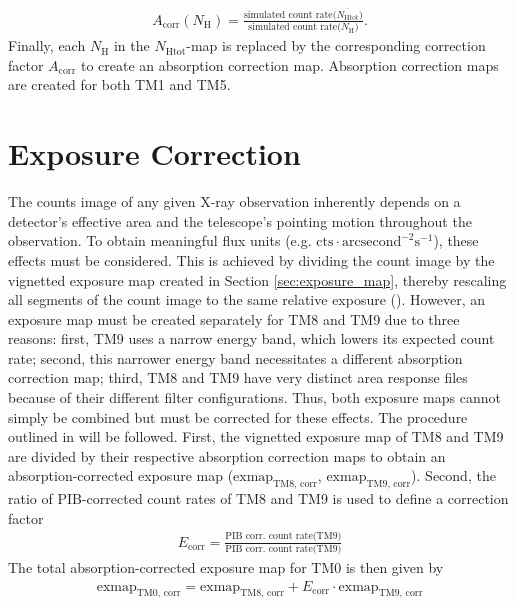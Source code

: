 \begin{align*}
    A_{\text{corr}}(N_\text{H}) = \frac{\text{simulated count rate}\bigl(\overline{N_{\text{Htot}}}\bigr)}{\text{simulated count rate}\bigl(N_\text{H}\bigr)}.
\end{align*}
Finally, each \(\textstyle{N_\text{H}}\) in the \({\textstyle N_\text{Htot}}\)-map is replaced by the corresponding correction factor \(A_\text{corr}\) to create an absorption correction map. Absorption correction maps are created for both TM1 and TM5.
\section{Exposure Correction}\label{sec:exposure}
The counts image of any given X-ray observation inherently depends on a detector's effective area and the telescope's pointing motion throughout the observation. To obtain meaningful flux units (e.g. \(\text{cts}\cdot\text{arcsecond}^{-2}\text{s}^{-1}\)), these effects must be considered. This is achieved by dividing the count image by the vignetted exposure map created in Section \ref{sec:exposure_map}, thereby rescaling all segments of the count image to the same relative exposure (\cite{davis2001formal}). However, an exposure map must be created separately for TM8 and TM9 due to three reasons: first, TM9 uses a narrow energy band, which lowers its expected count rate; second, this narrower energy band necessitates a different absorption correction map; third, TM8 and TM9 have very distinct area response files because of their different filter configurations. Thus, both exposure maps cannot simply be combined but must be corrected for these effects. The procedure outlined in \cite{Reiprich2021} will be followed. First, the vignetted exposure map of TM8 and TM9 are divided by their respective absorption correction maps to obtain an absorption-corrected exposure map (\(\text{exmap}_\text{TM8, corr}\), \(\text{exmap}_\text{TM9, corr}\)). Second, the ratio of PIB-corrected count rates of TM8 and TM9 is used to define a correction factor 
\begin{align*}
    E_\text{corr} = \frac{\text{PIB corr. count rate(TM9)}}{\text{PIB corr. count rate(TM9)}}
\end{align*}
The total absorption-corrected exposure map for TM0 is then given by
\begin{align*}
    \text{exmap}_\text{TM0, corr} = \text{exmap}_\text{TM8, corr} + E_\text{corr}\cdot\text{exmap}_\text{TM9, corr} 
\end{align*}
